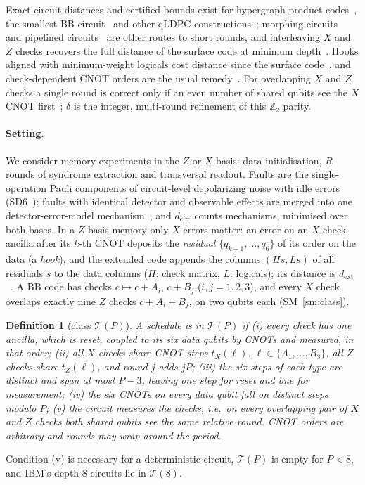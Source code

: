 \documentclass[aps,prl,twocolumn,superscriptaddress,nofootinbib]{revtex4-2}
\newcommand{\dcirc}{d_{\mathrm{circ}}}
\newcommand{\dext}{d_{\mathrm{ext}}}
\newcommand{\T}{\mathcal{T}}
\newtheorem{definition}{Definition}
\begin{document}
Exact circuit distances and certified bounds exist for hypergraph-product
codes~\cite{ManesClaes}, the smallest BB circuit~\cite{Webster2026} and other qLDPC
constructions~\cite{Liang2026,Ghosh2026}; morphing circuits~\cite{ShawTerhal2025,Wills2026}
and pipelined circuits~\cite{Xu2023} are other routes to short rounds, and interleaving
$X$ and $Z$ checks recovers the full distance of the surface code at minimum
depth~\cite{Hirai2026}. Hooks aligned with minimum-weight logicals cost distance since the
surface code~\cite{Dennis2002}, and check-dependent CNOT orders are the usual
remedy~\cite{TomitaSvore,KishonyFowler,Strikis2026}. For overlapping $X$ and $Z$ checks a
single round is correct only if an even number of shared qubits see the $X$ CNOT
first~\cite{Li2025parity,Zhang2026ASC,DurazoRocha2026}; $\delta$ is the integer, multi-round refinement of
this $\mathbb Z_2$ parity.

\paragraph{Setting.}
We consider memory experiments in the $Z$ or $X$ basis: data initialisation, $R$ rounds
of syndrome extraction and transversal readout. Faults are the single-operation Pauli
components of circuit-level depolarizing noise with idle errors
(SD6~\cite{Gidney2021honeycomb}); faults with identical detector and observable effects
are merged into one detector-error-model mechanism~\cite{Gidney2021stim}, and $\dcirc$
counts mechanisms, minimised over both bases. In a $Z$-basis memory only $X$ errors
matter: an error on an $X$-check ancilla after its $k$-th CNOT deposits the
\emph{residual} $\{q_{k+1},\dots,q_6\}$ of its order on the data (a \emph{hook}), and
the extended code appends the columns $(Hs,Ls)$ of all residuals $s$ to the data columns
($H$: check matrix, $L$: logicals); its distance is $\dext$~\cite{Strikis2026}. A
BB code has checks $c\mapsto c+A_i$, $c+B_j$ ($i,j=1,2,3$), and every $X$ check
overlaps exactly nine $Z$ checks $c+A_i+B_j$, on two qubits each (SM~\ref{sm:class}).

\begin{definition}[class $\T(P)$]
A schedule is in $\T(P)$ if (i) every check has one ancilla, which is reset, coupled to
its six data qubits by CNOTs and measured, in that order; (ii) all $X$ checks share CNOT
steps $t_X(\ell)$, $\ell\in\{A_1,\dots,B_3\}$, all $Z$ checks share $t_Z(\ell)$, and round
$j$ adds $jP$; (iii) the six steps of each type are distinct and span at most $P-3$, leaving
one step for reset and one for measurement; (iv) the six CNOTs on every data qubit fall on
distinct steps modulo $P$; (v) the circuit measures the checks, i.e.\ on every overlapping
pair of $X$ and $Z$ checks both shared qubits see the same relative round. CNOT orders are
arbitrary and rounds may wrap around the period.
\end{definition}
\noindent Condition (v) is necessary for a deterministic circuit, $\T(P)$ is empty for
$P<8$, and IBM's depth-8 circuits lie in $\T(8)$.
\end{document}
